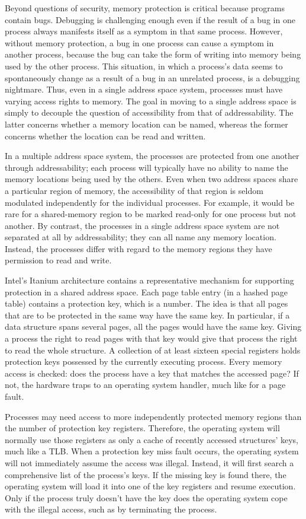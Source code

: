 Beyond questions of security, memory protection is critical because
programs contain bugs.  Debugging is challenging enough even if the
result of a bug in one process always manifests itself as a symptom in
that same process.  However, without memory protection, a bug in one
process can cause a symptom in another process, because the bug
can take the form of writing into memory being used by the other
process.  This situation, in which a process's data seems to
spontaneously change as a result of a bug in an unrelated process,
is a debugging nightmare.  Thus, even in a single address
space system, processes must have varying access rights to memory.
The goal in moving to a single address space is
simply to decouple the question of accessibility from that of
addressability.  The latter concerns whether a memory location can be
named, whereas the former concerns whether the location can be read
and written.

In a multiple address space system, the processes are protected from
one another through addressability; each process will typically have
no ability to name the memory locations being used by the others.
Even when two address spaces share a particular region of memory, the
accessibility of that region is seldom modulated independently for the
individual processes.  For example, it would be rare for a
shared-memory region to be marked read-only for one process but not
another.  By contrast, the processes in a single address space system
are not separated at all by addressability; they can all name any
memory location.  Instead, the processes differ with regard to the
memory regions they have permission to read and write.

Intel's Itanium architecture contains a representative mechanism for
supporting protection in a shared address space.  Each page table
entry (in a hashed page table) contains a protection key, which is
a number.  The idea is that all pages that are to be protected
in the same way have the same key.  In particular, if a data structure
spans several pages, all the pages would have the same key.
Giving a process the right to read pages with that key would give
that process the right to read the whole structure.  A collection of at least
sixteen special registers holds protection keys possessed by the currently
executing process.  Every memory access is checked: does the process
have a key that matches the accessed page?  If not, the hardware traps
to an operating system handler, much like for a page fault.

Processes may need access to more independently protected memory
regions than the number of protection key registers.  Therefore, the
operating system will normally use those registers as only a cache of
recently accessed structures' keys, much like a TLB.  When a
protection key miss fault occurs, the operating system will not
immediately assume the access was illegal.  Instead, it will first
search a comprehensive list of the process's keys.  If the missing key
is found there, the operating system will load it into one of the key
registers and resume execution.  Only if the process truly doesn't
have the key does the operating system cope with the illegal access,
such as by terminating the process.

